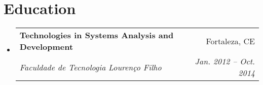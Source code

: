 \documentclass[letterpaper,11pt]{article}
\makeatletter
\newcommand{\resumeItem}[2]{
  \item\small{
    \textbf{#1}{: #2 \vspace{-2pt}}
  }
}
\newcommand{\resumeSubheading}[4]{
  \vspace{-1pt}\item
    \begin{tabular*}{0.97\textwidth}[t]{l@{\extracolsep{\fill}}r}
      \textbf{#1} & #2 \\
      \textit{\small#3} & \textit{\small #4} \\
    \end{tabular*}\vspace{-5pt}
}
\newcommand{\resumeSubSubheading}[2]{
    \begin{tabular*}{0.97\textwidth}{l@{\extracolsep{\fill}}r}
      \textit{\small#1} & \textit{\small #2} \\
    \end{tabular*}\vspace{-5pt}
}
\newcommand{\resumeSubItem}[2]{\resumeItem{#1}{#2}\vspace{-4pt}}
\newcommand{\resumeSubHeadingListStart}{\begin{itemize}[leftmargin=*]}
\newcommand{\resumeSubHeadingListEnd}{\end{itemize}}
\newcommand{\resumeItemListStart}{\begin{itemize}}
\newcommand{\resumeItemListEnd}{\end{itemize}\vspace{-5pt}}
\makeatother
\begin{document}
\section{Education}
  \resumeSubHeadingListStart
    \resumeSubheading
      {Technologies in Systems Analysis and Development}{Fortaleza, CE}
      {Faculdade de Tecnologia Lourenço Filho}{Jan. 2012 -- Oct. 2014}
  \resumeSubHeadingListEnd


%
%
\end{document}
